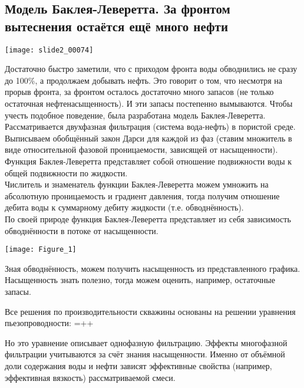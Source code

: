 \documentclass[main.tex]{subfiles}
\begin{document}
\subsection{Модель Баклея-Леверетта. За фронтом вытеснения остаётся ещё много нефти}

\texttt{[image: slide2\_00074]}

Достаточно быстро заметили, что с приходом фронта воды обводнились не сразу до 100\%, а продолжаем добывать нефть. Это говорит о том, что несмотря на прорыв фронта, за фронтом осталось достаточно много запасов (не только остаточная нефтенасыщенность). И эти запасы постепенно вымываются. Чтобы учесть подобное поведение, была разработана модель Баклея-Леверетта.\\

Рассматривается двухфазная фильтрация (система вода-нефть) в пористой среде. Выписываем обобщённый закон Дарси для каждой из фаз (ставим множитель в виде относительной фазовой проницаемости, зависящей от насыщенности).\\

Функция Баклея-Леверетта представляет собой отношение подвижности воды к общей подвижности по жидкости.\\

Числитель и знаменатель функции Баклея-Леверетта можем умножить на абсолютную проницаемость и градиент давления, тогда получим отношение дебита воды к суммарному дебиту жидкости (т.е. обводнённость).\\

По своей природе функция Баклея-Леверетта представляет из себя зависимость обводнённости в потоке от насыщенности.


\begin{center}
\texttt{[image: Figure\_1]}
\end{center}

Зная обводнённость, можем получить насыщенность из представленного графика. Насыщенность знать полезно, тогда можем оценить, например, остаточные запасы.

Все решения по производительности скважины основаны на решении уравнения пьезопроводности:
\beq
{}=++
\eeq

Но это уравнение описывает однофазную фильтрацию. Эффекты многофазной фильтрации учитываются за счёт знания насыщенности. Именно от объёмной доли содержания воды и нефти зависят эффективные свойства (например, эффективная вязкость) рассматриваемой смеси.
\end{document}
